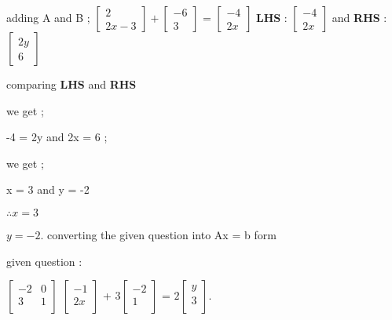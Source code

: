 \documentclass[journal,12pt,twocolumn]{IEEEtran}
\theoremstyle{remark}
\numberwithin{equation}{subsection}
\begin{document}
      adding A and B ;
      $\begin{bmatrix}
        2 \\
        2x-3
      \end{bmatrix}
      +
      \begin{bmatrix}
        -6 \\
        3
      \end{bmatrix}$
      =
      $\begin{bmatrix}
        -4 \\
        2x
      \end{bmatrix}$
      \newpage
      \textbf{LHS} : $\begin{bmatrix}
        -4 \\
        2x
      \end{bmatrix}$
     \hspace{3cm} and \hspace{3cm}
      \textbf{RHS} : $\begin{bmatrix}
        2y \\
        6
      \end{bmatrix}$
      
      
      comparing \textbf{LHS} and \textbf{RHS}
      
      we get ;
      
      -4 = 2y and 2x = 6 ;
      
      we get ;
      
      x = 3 and y = -2 
      
  $ \therefore x = 3 $
     
                 $   y = -2 $.
     \newpage
     \large
   converting the given question into Ax = b form 
   
   given question :
   
   \vspace{1cm}
    $\begin{bmatrix}
        -2 & 0 \\
        3 & 1 \\
      \end{bmatrix}$
      $\begin{bmatrix}
        -1 \\
        2x \\
      \end{bmatrix}$ +
      $3$$\begin{bmatrix}
        -2 \\
         1 \\
      \end{bmatrix}$  \hspace{0.05cm}= 
      \hspace{0.05cm} $2$$\begin{bmatrix}
         y \\
         3 \\
      \end{bmatrix}$.
      
\end{document}
